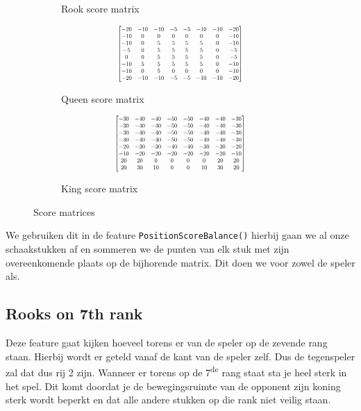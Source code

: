 \documentclass[a4paper,openany]{uantwerpenassignment}
\newcommand{\codeword}[1]{
    \colorbox{code}{\texttt{\textcolor{codetext}{#1}}}
}
\newcommand{\ts}{\textsuperscript}
\newcommand\scalemath[2]{\scalebox{#1}{\mbox{\ensuremath{\displaystyle #2}}}}
\begin{document}
\begin{figure}[h]
\begin{subfigure}{.3\textwidth}
$$		$$
		\caption{Rook score matrix}
    \end{subfigure}
    \begin{subfigure}{.3\textwidth}
    	$$
    	\scalemath{0.6}{
    	\begin{bmatrix}
		-20& -10& -10& -5& -5& -10& -10& -20\\
		-10& 0& 0& 0& 0& 0& 0& -10\\
		-10& 0& 5& 5& 5& 5& 0& -10\\
		-5& 0& 5& 5& 5& 5& 0& -5\\
		0& 0& 5& 5& 5& 5& 0& -5\\
		-10& 5& 5& 5& 5& 5& 0& -10\\
		-10& 0& 5& 0& 0& 0& 0& -10\\
		-20& -10& -10& -5& -5& -10& -10& -20
		\end{bmatrix}}
		$$
		\caption{Queen score matrix}
    \end{subfigure}
    \begin{subfigure}{.3\textwidth}
    	$$
    	\scalemath{0.6}{
    	\begin{bmatrix}
		-30& -40& -40& -50& -50& -40& -40& -30\\
		-30& -40& -40& -50& -50& -40& -40& -30\\
		-30& -40& -40& -50& -50& -40& -40& -30\\
		-30& -40& -40& -50& -50& -40& -40& -30\\
		-20& -30& -30& -40& -40& -30& -30& -20\\
		-10& -20& -20& -20& -20& -20& -20& -10\\
		20& 20& 0& 0& 0& 0& 20& 20\\
		20& 30& 10& 0& 0& 10& 30& 20
		\end{bmatrix}}
		$$
		\caption{King score matrix}
    \end{subfigure}
    \caption{Score matrices}
\end{figure}

We gebruiken dit in de feature \codeword{PositionScoreBalance()} hierbij gaan we al onze schaakstukken af en sommeren we de punten van elk stuk met zijn overeenkomende plaats op de bijhorende matrix. Dit doen we voor zowel de speler als.

\subsection{Rooks on 7th rank}
Deze feature gaat kijken hoeveel torens er van de speler op de zevende rang staan. Hierbij wordt er geteld vanaf de kant van de speler zelf. Dus de tegenspeler zal dat dus rij 2 zijn. Wanneer er torens op de 7\ts{de} rang staat sta je heel sterk in het spel. Dit komt doordat je de bewegingsruimte van de opponent zijn koning sterk wordt beperkt en dat alle andere stukken op die rank niet veilig staan.
\end{document}
